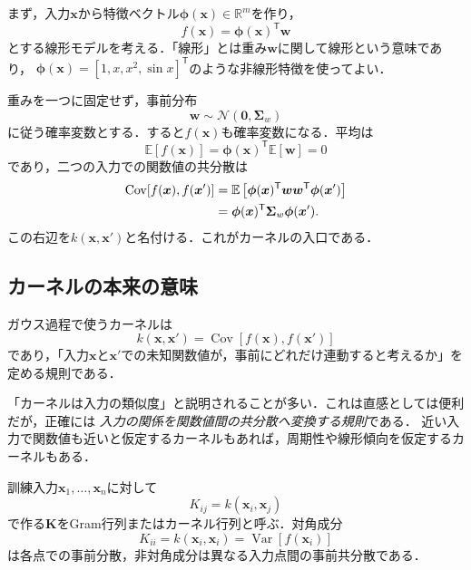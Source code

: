 \documentclass[a4paper,11pt]{ltjsarticle}
\newcommand{\E}{\mathbb E}
\newcommand{\R}{\mathbb R}
\newcommand{\N}{\mathcal N}
\newcommand{\T}{\mathsf T}
\newcommand{\Var}{\operatorname{Var}}
\newcommand{\Cov}{\operatorname{Cov}}
\begin{document}
まず，入力\(\bm x\)から特徴ベクトル\(\bm\phi(\bm x)\in\R^m\)を作り，
\begin{equation}
  f(\bm x)=\bm\phi(\bm x)^\T\bm w
  \label{eq:linear-feature-model}
\end{equation}
とする線形モデルを考える．「線形」とは重み\(\bm w\)に関して線形という意味であり，
\(\bm\phi(\bm x)=[1,x,x^2,\sin x]^\T\)のような非線形特徴を使ってよい．

重みを一つに固定せず，事前分布
\begin{equation}
  \bm w\sim\N(\bm0,\bm\Sigma_w)
  \label{eq:weight-prior}
\end{equation}
に従う確率変数とする．すると\(f(\bm x)\)も確率変数になる．平均は
\begin{equation}
  \E[f(\bm x)]
  =\bm\phi(\bm x)^\T\E[\bm w]=0
\end{equation}
であり，二つの入力での関数値の共分散は
\begin{align}
  \Cov[f(\bm x),f(\bm x')]
  &=\E\left[
    \bm\phi(\bm x)^\T\bm w\bm w^\T\bm\phi(\bm x')
  \right]\notag\\
  &=\bm\phi(\bm x)^\T\bm\Sigma_w\bm\phi(\bm x').
  \label{eq:feature-kernel}
\end{align}
この右辺を\(k(\bm x,\bm x')\)と名付ける．これがカーネルの入口である．

\subsection{カーネルの本来の意味}

\begin{definitionbox}[共分散カーネル]
ガウス過程で使うカーネルは
\begin{equation}
  k(\bm x,\bm x')
  =\Cov[f(\bm x),f(\bm x')]
  \label{eq:kernel-as-covariance}
\end{equation}
であり，「入力\(\bm x\)と\(\bm x'\)での未知関数値が，事前にどれだけ連動すると考えるか」を定める規則である．
\end{definitionbox}

「カーネルは入力の類似度」と説明されることが多い．これは直感としては便利だが，正確には
\emph{入力の関係を関数値間の共分散へ変換する規則}である．
近い入力で関数値も近いと仮定するカーネルもあれば，周期性や線形傾向を仮定するカーネルもある．

訓練入力\(\bm x_1,\ldots,\bm x_n\)に対して
\begin{equation}
  K_{ij}=k(\bm x_i,\bm x_j)
  \label{eq:gram-matrix}
\end{equation}
で作る\(\bm K\)をGram行列またはカーネル行列と呼ぶ．対角成分
\begin{equation}
  K_{ii}=k(\bm x_i,\bm x_i)=\Var[f(\bm x_i)]
\end{equation}
は各点での事前分散，非対角成分は異なる入力点間の事前共分散である．
\end{document}
